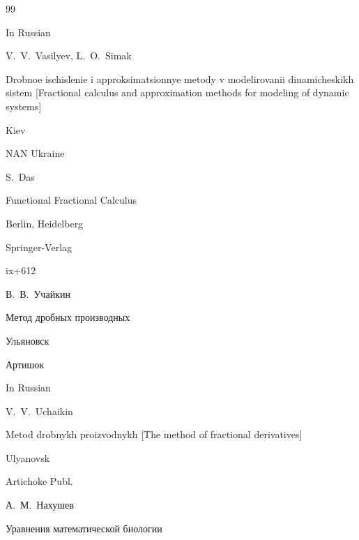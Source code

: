 \begin{thebibliography}{99}


\misctransl

\lang In Russian

\by V.~V.~Vasilyev, L.~O.~Simak  


\book Drobnoe ischislenie i approksimatsionnye metody v modelirovanii dinamicheskikh sistem  \rm [Fractional calculus and approximation methods for modeling of dynamic systems]

\publaddr Kiev

\publ NAN Ukraine









\by S.~Das

\book Functional Fractional Calculus

\publaddr Berlin, Heidelberg

\publ Springer-Verlag

\totalpages ix+612








\by В.~В.~Учайкин

\book Метод дробных производных

\publaddr Ульяновск

\publ Артишок



\misctransl

\lang In Russian

\by  V.~V.~Uchaikin  


\book  Metod drobnykh proizvodnykh \rm [The method of fractional derivatives]

\publaddr Ulyanovsk

\publ Artichoke Publ.







\by А.~М.~Нахушев

\book Уравнения математической биологии


\end{thebibliography}
